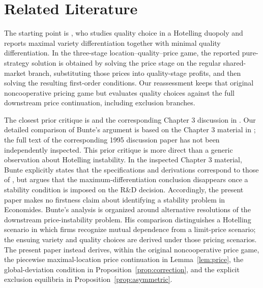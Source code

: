 \section{Related Literature}\label{sec:literature}

The starting point is \citet{Economides1989}, who studies quality choice in a Hotelling duopoly and reports maximal variety differentiation together with minimal quality differentiation. In the three-stage location--quality--price game, the reported pure-strategy solution is obtained by solving the price stage on the regular shared-market branch, substituting those prices into quality-stage profits, and then solving the resulting first-order conditions. Our reassessment keeps that original noncooperative pricing game but evaluates quality choices against the full downstream price continuation, including exclusion branches.

The closest prior critique is \citet{Bunte1995} and the corresponding Chapter 3 discussion in \citet{Bunte1997}. Our detailed comparison of Bunte's argument is based on the Chapter 3 material in \citet{Bunte1997}; the full text of the corresponding 1995 discussion paper has not been independently inspected. This prior critique is more direct than a generic observation about Hotelling instability. In the inspected Chapter 3 material, Bunte explicitly states that the specifications and derivations correspond to those of \citet{Economides1989}, but argues that the maximum-differentiation conclusion disappears once a stability condition is imposed on the R\&D decision. Accordingly, the present paper makes no firstness claim about identifying a stability problem in Economides. Bunte's analysis is organized around alternative resolutions of the downstream price-instability problem. His comparison distinguishes a Hotelling scenario in which firms recognize mutual dependence from a limit-price scenario; the ensuing variety and quality choices are derived under those pricing scenarios. The present paper instead derives, within the original noncooperative price game, the piecewise maximal-location price continuation in Lemma~\ref{lem:price}, the global-deviation condition in Proposition~\ref{prop:correction}, and the explicit exclusion equilibria in Proposition~\ref{prop:asymmetric}.

